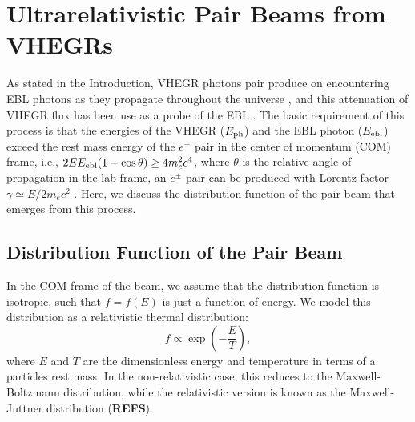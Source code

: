 \documentclass[usenatbib,iop,apj,numberedappendix]{aeb_emulateapj_2010}
\begin{document}
\section{Ultrarelativistic Pair Beams from VHEGRs}\label{sec:setup}

As stated in the Introduction, VHEGR photons pair produce on encountering EBL photons as they propagate throughout the universe \citep{Gould+66}, and this attenuation of VHEGR flux has been use as a probe of the EBL \citep{Stec-deJa-Sala:92,deJa-Stec-Sala:94,Ahar_etal:06}.
The basic requirement of this process is that the energies of the VHEGR ($E_{\rm ph}$) and the EBL photon
  ($E_{\rm ebl}$) exceed the rest mass energy of the $e^\pm$ pair in the center
  of momentum (COM) frame, i.e., $2 E E_{\rm ebl}(1-\cos\theta) \geq 4 m_e^2 c^4$, where
  $\theta$ is the relative angle of propagation in the lab frame, an $e^\pm$
  pair can be produced with Lorentz factor $\gamma\simeq E/2m_e c^2$
  \citep{Goul-Schr:67}.  Here, we discuss the distribution function of the pair beam that emerges from this process.



  

\subsection{Distribution Function of the Pair Beam}

In the COM frame of the beam, we assume that the distribution function is isotropic, such that $f=f(E)$ is just a function of energy.  We model this distribution as a relativistic thermal distribution:
\begin{equation}\label{eq:relativistic maxwellian}
f\propto \exp\left(-\frac E T\right),
\end{equation}
 where $E$ and $T$ are the dimensionless energy and temperature in terms of a particles rest mass.  In the non-relativistic case, this reduces to the Maxwell-Boltzmann distribution, while the relativistic version is known as the Maxwell-Juttner distribution ({\bf REFS}). 
\end{document}
